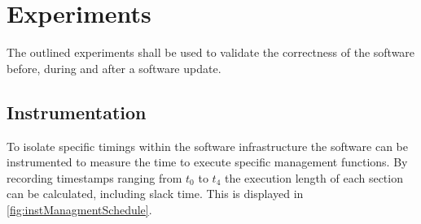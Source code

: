 \section{Experiments} \label{sec:experiment}

The outlined experiments shall be used to validate the correctness of the software before, during and after a software update.

\subsection{Instrumentation}

To isolate specific timings within the software infrastructure the software can be instrumented to measure the time to execute specific management functions. By recording timestamps ranging from $t_0$ to $t_4$ the execution length of each section can be calculated, including slack time. This is displayed in \autoref{fig:instManagmentSchedule}.

